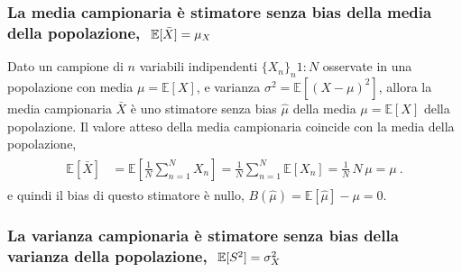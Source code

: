 \documentclass[letterpaper,10pt,italian]{jupyterBook}
\begin{document}
\subsubsection*{La media campionaria è stimatore senza bias della media della popolazione, \protect\(\ \mathbb{E}[\bar{X}] = \mu_X\protect\)}

\sphinxAtStartPar
Dato un campione di \(n\) variabili indipendenti \(\{ X_n \}_n{1:N}\) osservate in una popolazione con media \(\mu = \mathbb{E}[X]\), e varianza \(\sigma^2 = \mathbb{E}\left[ (X-\mu)^2 \right]\), allora la media campionaria \(\bar{X}\) è uno stimatore senza bias \(\hat{\mu}\) della media \(\mu = \mathbb{E}[X]\) della popolazione. Il valore atteso della media campionaria coincide con la media della popolazione,
\begin{equation*}
\begin{split}\begin{aligned}
  \mathbb{E}[\bar{X}] 
  & = \mathbb{E}\left[ \frac{1}{N} \sum_{n=1}^N X_n \right]
    = \frac{1}{N} \sum_{n=1}^N \mathbb{E} \left[ X_n \right] = \frac{1}{N} \, N \, \mu = \mu \ .
\end{aligned}\end{split}
\end{equation*}
\sphinxAtStartPar
e quindi il bias di questo stimatore è nullo, \(B(\hat{\mu}) = \mathbb{E}[\hat{\mu}] - \mu = 0\).
\subsubsection*{La varianza campionaria è stimatore senza bias della varianza della popolazione, \protect\(\ \mathbb{E}[S^2] = \sigma_X^2\protect\)}
\end{document}
